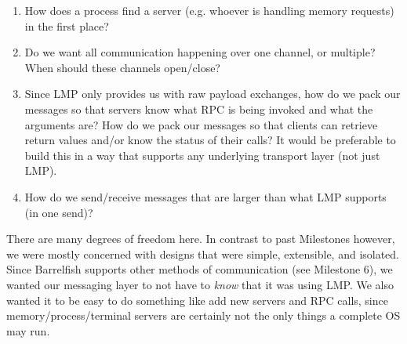 \begin{enumerate}[itemsep=0pt]
    \item How does a process find a server (e.g. whoever is handling memory requests) in the first place?
    \item Do we want all communication happening over one channel, or multiple? When should these channels open/close?
    \item Since LMP only provides us with raw payload exchanges, how do we pack our messages so that servers know what RPC is being invoked and what the arguments are? How do we pack our messages so that clients can retrieve return values and/or know the status of their calls? It would be preferable to build this in a way that supports any underlying transport layer (not just LMP).
    \item How do we send/receive messages that are larger than what LMP supports (in one send)?
\end{enumerate}
There are many degrees of freedom here. In contrast to past Milestones however, we were mostly concerned with designs that were simple, extensible, and isolated. Since Barrelfish supports other methods of communication (see Milestone 6), we wanted our messaging layer to not have to \textit{know} that it was using LMP. We also wanted it to be easy to do something like add new servers and RPC calls, since memory/process/terminal servers are certainly not the only things a complete OS may run.

